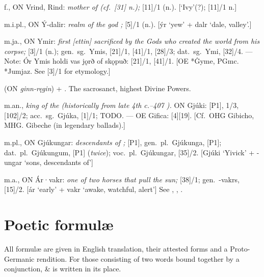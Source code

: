 \begin{itemize}
 f., ON Vrind, Rind:
  \emph{mother of  (cf.~[31] n.);}  [11]/1 (n.).
  [‘Ivy’(?); [11]/1 n.]

 m.i.pl., ON Ý-dalir:
  \emph{realm of the god ;} [5]/1 (n.).
  [ýr ‘yew’ + dalr ‘dale, valley’.]

 m.ja., ON Ymir:
  \emph{first [ettin] sacrificed by the Gods who created the world from his corpse;} [3]/1 (n.); %
  gen.~sg.~Ymis, [21]/1, [41]/1, [28]/3; %
  dat.~sg.~Ymi, [32]/4.
  --- Note: Ór Ymis holdi vas jǫrð of skǫpuð: [21]/1, [41]/1.
  [OE *Ġyme, PGmc. *Jumjaz.  See [3]/1 for etymology.]

 (ON \emph{ginn-ręgin})
   + . The sacrosanct, highest Divine Powers.

 m.an.,
  \emph{king of the  (historically from late 4th c.--407 \ce).}
  ON Gjúki: [P1], 1/3, [102]/2; acc.~sg.~Gjúka, [1]/1; TODO.
  --- OE Gifica: [4][19].
  [Cf.~OHG Gibicho, MHG. Gibeche (in legendary ballads).]

 m.pl., ON Gjúkungar:
  \emph{descendants of ;} [P1], gen.~pl.~Gjúkunga, [P1]; dat.~pl.~Gjúkungum, [P1] (\emph{twice}); voc.~pl.~Gjúkungar, [35]/2.
  [Gjúki ‘Yivick’ + -ungar ‘sons, descendants of’]

 m.a., ON Ár·vakr:
  \emph{one of two horses that pull the sun;} [38]/1; gen.~-vakrs, [15]/2.
  [ár ‘early’ + vakr ‘awake, watchful, alert’]
  See , , .

\end{itemize}

\newpage

\section{Poetic formulæ}
All formulæ are given in English translation, their attested forms and a Proto-Germanic rendition. For those consisting of two words bound together by a conjunction, \& is written in its place.

